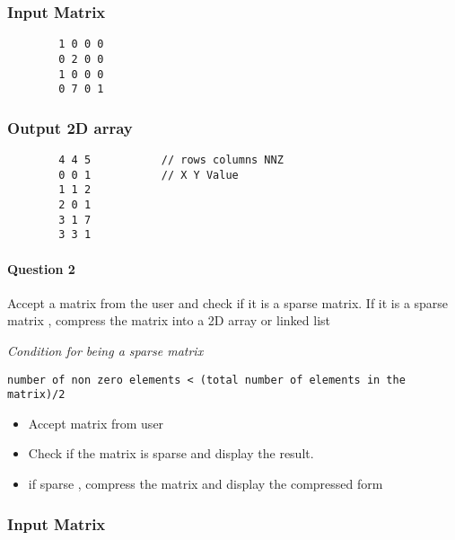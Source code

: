 \documentclass[
]{article}
\begin{document}
\hypertarget{input-matrix}{%
\subsubsection{Input Matrix}\label{input-matrix}}

\begin{verbatim}
        1 0 0 0
        0 2 0 0
        1 0 0 0
        0 7 0 1
\end{verbatim}

\hypertarget{output-2d-array}{%
\subsubsection{Output 2D array}\label{output-2d-array}}

\begin{verbatim}
        4 4 5           // rows columns NNZ
        0 0 1           // X Y Value
        1 1 2           
        2 0 1                
        3 1 7           
        3 3 1           
\end{verbatim}

\newpage

\hypertarget{question-2}{%
\paragraph{Question 2}\label{question-2}}

Accept a matrix from the user and check if it is a sparse matrix. If it
is a sparse matrix , compress the matrix into a 2D array or linked list

\emph{Condition for being a sparse matrix}

\begin{verbatim}
number of non zero elements < (total number of elements in the matrix)/2
\end{verbatim}

\begin{itemize}
\item
  Accept matrix from user
\item
  Check if the matrix is sparse and display the result.
\item
  if sparse , compress the matrix and display the compressed form
\end{itemize}

\hypertarget{input-matrix-1}{%
\subsubsection{Input Matrix}\label{input-matrix-1}}
\end{document}
